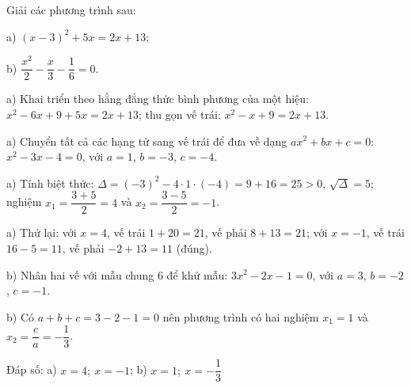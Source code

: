 \begin{problem}[9DS-PT2-038]
Giải các phương trình sau:

a) $(x - 3)^2 + 5x = 2x + 13$;

b) $\dfrac{x^2}{2} - \dfrac{x}{3} - \dfrac{1}{6} = 0$.

\begin{solution}
a) Khai triển theo hằng đẳng thức bình phương của một hiệu: $x^2 - 6x + 9 + 5x = 2x + 13$; thu gọn vế trái: $x^2 - x + 9 = 2x + 13$.

a) Chuyển tất cả các hạng tử sang vế trái để đưa về dạng $ax^2 + bx + c = 0$: $x^2 - 3x - 4 = 0$, với $a = 1$, $b = -3$, $c = -4$.

a) Tính biệt thức: $\Delta = (-3)^2 - 4 \cdot 1 \cdot (-4) = 9 + 16 = 25 > 0$, $\sqrt{\Delta} = 5$; nghiệm $x_1 = \dfrac{3 + 5}{2} = 4$ và $x_2 = \dfrac{3 - 5}{2} = -1$.

a) Thử lại: với $x = 4$, vế trái $1 + 20 = 21$, vế phải $8 + 13 = 21$; với $x = -1$, vế trái $16 - 5 = 11$, vế phải $-2 + 13 = 11$ (đúng).

b) Nhân hai vế với mẫu chung $6$ để khử mẫu: $3x^2 - 2x - 1 = 0$, với $a = 3$, $b = -2$, $c = -1$.

b) Có $a + b + c = 3 - 2 - 1 = 0$ nên phương trình có hai nghiệm $x_1 = 1$ và $x_2 = \dfrac{c}{a} = -\dfrac{1}{3}$.

Đáp số: a) $\boxed{x = 4;\ x = -1}$; b) $\boxed{x = 1;\ x = -\dfrac{1}{3}}$
\end{solution}
\end{problem}


